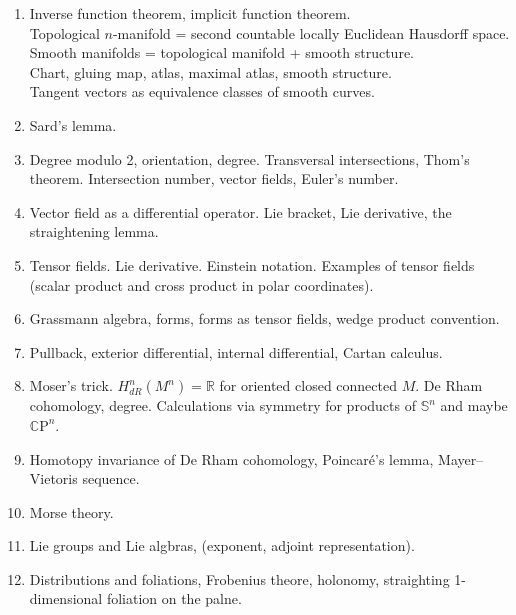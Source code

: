 \documentclass[twoside]{book}
\begin{document}
\begin{enumerate}

\item
Inverse function theorem, implicit function theorem.
\\
Topological $n$-manifold = second countable locally Euclidean Hausdorff space.\\
Smooth manifolds = topological manifold + smooth structure.\\
Chart, gluing map, atlas, maximal atlas, smooth structure.\\
Tangent vectors as equivalence classes of smooth curves.

\item Sard's lemma.

\item Degree modulo 2, orientation, degree.
Transversal intersections, Thom's theorem.
Intersection number, vector fields, Euler's number.

\item Vector field as a differential operator.
Lie bracket, Lie derivative, the straightening lemma.

\item Tensor fields.
Lie derivative.
Einstein notation.
Examples of tensor fields (scalar product and cross product in polar coordinates).

\item Grassmann algebra, forms, forms as tensor fields, wedge product convention.

\item Pullback, exterior  differential, internal differential, Cartan calculus.

\item Moser's trick.
$H^n_{dR}(M^n)=\mathbb{R}$ for oriented closed connected $M$.
De Rham cohomology, degree.
Calculations via symmetry for products of $\mathbb{S}^n$ and maybe $\mathbb{C}\mathrm{P}^n$.

\item Homotopy invariance of De Rham cohomology, Poincaré's lemma, Mayer--Vietoris sequence.

\item Morse theory.

\item Lie groups and Lie algbras, (exponent, adjoint representation).

\item Distributions and foliations, Frobenius theore, holonomy, straighting 1-dimensional foliation on the palne.

\end{enumerate}

%















{

\sloppy

\def\emph{\textit}

\printbibliography[heading=bibintoc]

\fussy

}
\end{document}
